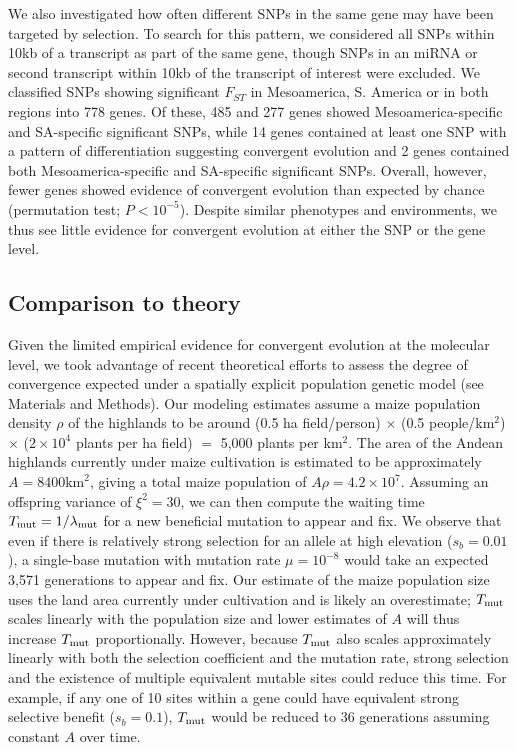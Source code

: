 We also investigated how often different SNPs in the same gene may have been targeted by selection. 
To search for this pattern, we considered all SNPs within 10kb of a transcript as part of the same gene, though SNPs in an miRNA or second transcript within 10kb of the transcript of interest were excluded.  
We classified SNPs showing significant $F_{ST}$ in Mesoamerica, S. America or in both regions into 778 genes. 
Of these, 485 and 277 genes showed Mesoamerica-specific and SA-specific significant SNPs, while 14 genes contained at least one SNP with a pattern of differentiation suggesting convergent evolution and 2 genes contained both Mesoamerica-specific and SA-specific significant SNPs. 
Overall, however, fewer genes showed evidence of convergent evolution than expected by chance (permutation test; $P<10^{-5}$). 
Despite similar phenotypes and environments, we thus see little evidence for convergent evolution at either the SNP or the gene level.  

\subsection*{Comparison to theory}


Given the limited empirical evidence for convergent evolution at the molecular level, we took advantage of recent theoretical efforts \cite[]{ralph2014convergent} to assess the degree of convergence expected under a spatially explicit population genetic model (see Materials and Methods).
Our modeling estimates assume a maize population density $\rho$ of the highlands to be around (0.5 ha field/person) $\times$ (0.5 people/km$^2$) $\times$ ($2\times 10^4$ plants per ha field) $=$ 5,000 plants per km$^2$.
The area of the Andean highlands currently under maize cultivation is estimated to be approximately $A=8400\text{km}^2$, giving a total maize population of $A \rho = 4.2 \times 10^7$. %
Assuming an offspring variance of $\xi^2 = 30$, we can then compute the waiting time $T_{\text{mut}}=1/\lambda_{\text{mut}}$ for a new beneficial mutation to appear and fix.
We observe that even if there is relatively strong selection for an allele at high elevation ($s_b=0.01$), a single-base mutation with mutation rate $\mu=10^{-8}$ would take an expected 3,571 generations to appear and fix.
Our estimate of the maize population size uses the land area currently under cultivation and is likely an overestimate; $T_{\text{mut}}$ scales linearly with the population size and lower estimates of $A$ will thus increase $T_{\text{mut}}$ proportionally.
However, because $T_{\text{mut}}$ also scales approximately linearly with both the selection coefficient and the mutation rate, strong selection and the existence of multiple equivalent mutable sites could reduce this time. 
For example, if any one of 10 sites within a gene could have equivalent strong selective benefit ($s_b=0.1$), $T_{\text{mut}}$ would be reduced to 36 generations assuming constant $A$ over time. 

